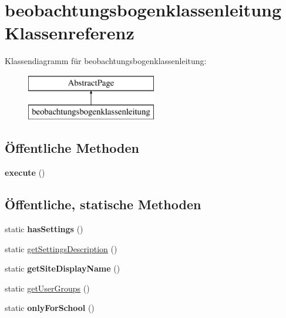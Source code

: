 \hypertarget{classbeobachtungsbogenklassenleitung}{}\section{beobachtungsbogenklassenleitung Klassenreferenz}
\label{classbeobachtungsbogenklassenleitung}
Klassendiagramm für beobachtungsbogenklassenleitung\+:\begin{figure}[H]
\begin{center}
\leavevmode
\includegraphics[height=2.000000cm]{classbeobachtungsbogenklassenleitung}
\end{center}
\end{figure}
\subsection*{Öffentliche Methoden}
\begin{DoxyCompactItemize}
\item 
\mbox{\label{classbeobachtungsbogenklassenleitung_aa8b2140bef2e5f172de5b03ef1dd2a4d}} 
{\bfseries execute} ()
\end{DoxyCompactItemize}
\subsection*{Öffentliche, statische Methoden}
\begin{DoxyCompactItemize}
\item 
\mbox{\label{classbeobachtungsbogenklassenleitung_a8dd1926228a9800718a5ef2690b597d5}} 
static {\bfseries has\+Settings} ()
\item 
static \mbox{\hyperlink{classbeobachtungsbogenklassenleitung_a25f634bb0493b0d8a6766d1463e5e53b}{get\+Settings\+Description}} ()
\item 
\mbox{\label{classbeobachtungsbogenklassenleitung_a09d17d78659480debcb0cf19b353c42c}} 
static {\bfseries get\+Site\+Display\+Name} ()
\item 
static \mbox{\hyperlink{classbeobachtungsbogenklassenleitung_a11080113d5f14e963e5dabf12eb2fca2}{get\+User\+Groups}} ()
\item 
\mbox{\label{classbeobachtungsbogenklassenleitung_a04db8f2abda333ce602916bbafd37872}} 
static {\bfseries only\+For\+School} ()
\end{DoxyCompactItemize}
